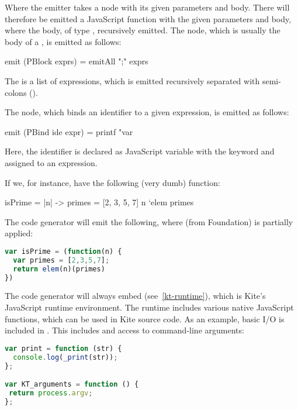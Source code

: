Where the emitter takes a  node with its given parameters and body. There will therefore be emitted a JavaScript function with the given parameters and body, where the body, of type , recursively emitted. The  node, which is usually the body of a , is emitted as follows:

\begin{haskell}
emit (PBlock exprs) = emitAll ";" exprs
\end{haskell}

The  is a list of expressions, which is emitted recursively separated with semi-colons (\code{;}).

The  node, which binds an identifier to a given expression, is emitted as follows:
\begin{haskell}
emit (PBind ide expr) =
  printf "var %
\end{haskell}
Here, the identifier is declared as JavaScript variable with the keyword  and assigned to an expression.

If we, for instance, have the following (very dumb) function:
\begin{kite}
isPrime = |n| -> {
  primes = [2, 3, 5, 7]
  n `elem primes
}
\end{kite}

The code generator will emit the following, where  (from Foundation) is partially applied:
\begin{lstlisting}[language=Javascript]
var isPrime = (function(n) {
  var primes = [2,3,5,7];
  return elem(n)(primes)
})
\end{lstlisting}

The code generator will always embed  (see~\ref{kt-runtime}), which is Kite's JavaScript runtime environment. The runtime includes various native JavaScript functions, which can be used in Kite source code. As an example, basic I/O is included in . This includes  and access to command-line arguments:
\begin{lstlisting}[language=Javascript]
var print = function (str) {
  console.log(_print(str));
};

var KT_arguments = function () {
 return process.argv;
};
\end{lstlisting}
